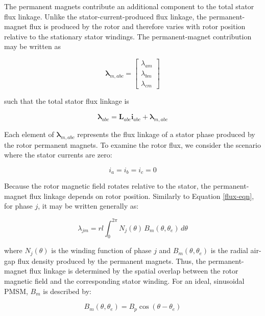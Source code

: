 \documentclass{article}
\begin{document}
The permanent magnets contribute an additional component to the total stator flux linkage. Unlike the stator-current-produced flux linkage, the permanent-magnet flux is produced by the rotor and therefore varies with rotor position relative to the stationary stator windings. The permanent-magnet contribution may be written as

\begin{equation}
\boldsymbol{\lambda}_{m,abc}
=
\begin{bmatrix}
\lambda_{am} \\
\lambda_{bm} \\
\lambda_{cm}
\end{bmatrix}
\end{equation}

such that the total stator flux linkage is

\begin{equation}
\boldsymbol{\lambda}_{abc}
=
\mathbf{L}_{abc}\mathbf{i}_{abc}
+
\boldsymbol{\lambda}_{m,abc}
\end{equation}

Each element of $\boldsymbol{\lambda}_{m,abc}$ represents the flux linkage of a stator phase produced by the rotor permanent magnets. To examine the rotor flux, we consider the scenario where the stator currents are zero:

\begin{equation}
    i_a = i_b = i_c = 0
\end{equation}

Because the rotor magnetic field rotates relative to the stator, the permanent-magnet flux linkage depends on rotor position. Similarly to Equation \ref{flux-eqn}, for phase $j$, it may be written generally as:

\begin{equation}
\lambda_{jm}
=
rl
\int_0^{2\pi}
N_j(\theta)\,
B_m(\theta,\theta_e)
\,d\theta
\end{equation}

where $N_j(\theta)$ is the winding function of phase $j$ and $B_m(\theta,\theta_e)$ is the radial air-gap flux density produced by the permanent magnets. Thus, the permanent-magnet flux linkage is determined by the spatial overlap between the rotor magnetic field and the corresponding stator winding. For an ideal, sinusoidal PMSM, $B_m$ is described by:

\begin{equation}
    B_m(\theta, \theta_e) = B_{p}\cos(\theta - \theta_e)
\end{equation}
\end{document}
